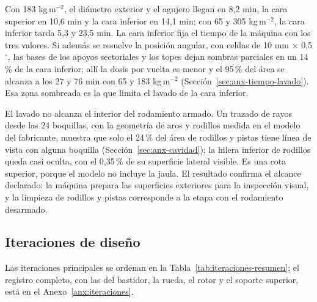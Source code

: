 Con 183 kg\,m$^{-2}$, el diámetro exterior y el agujero llegan en 8,2 min, la cara superior en 10,6 min y la cara inferior en 14,1 min; con 65 y 305 kg\,m$^{-2}$, la cara inferior tarda 5,3 y 23,5 min. La cara inferior fija el tiempo de la máquina con los tres valores. Si además se resuelve la posición angular, con celdas de 10 mm $\times$ 0,5$^\circ$, las bases de los apoyos sectoriales y los topes dejan sombras parciales en un 14\,\% de la cara inferior; allí la dosis por vuelta es menor y el 95\,\% del área se alcanza a los 27 y 76 min con 65 y 183 kg\,m$^{-2}$ (Sección~\ref{sec:anx-tiempo-lavado}). Esa zona sombreada es la que limita el lavado de la cara inferior.

El lavado no alcanza el interior del rodamiento armado. Un trazado de rayos desde las 24 boquillas, con la geometría de aros y rodillos medida en el modelo del fabricante, muestra que solo el 24\,\% del área de rodillos y pistas tiene línea de vista con alguna boquilla (Sección~\ref{sec:anx-cavidad}); la hilera inferior de rodillos queda casi oculta, con el 0,35\,\% de su superficie lateral visible. Es una cota superior, porque el modelo no incluye la jaula. El resultado confirma el alcance declarado: la máquina prepara las superficies exteriores para la inspección visual, y la limpieza de rodillos y pistas corresponde a la etapa con el rodamiento desarmado.

\subsection{Iteraciones de diseño}

Las iteraciones principales se ordenan en la Tabla~\ref{tab:iteraciones-resumen}; el registro completo, con las del bastidor, la rueda, el rotor y el soporte superior, está en el Anexo~\ref{anx:iteraciones}.

